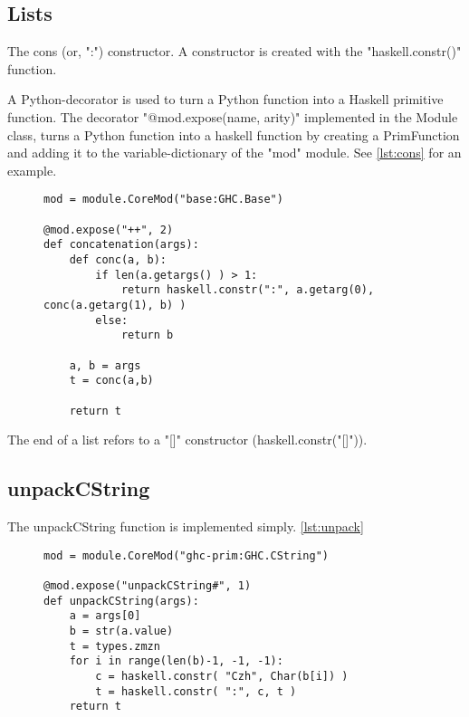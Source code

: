 \subsection{Lists}

The cons (or, ":") constructor. A constructor is created with the "haskell.constr()"
function.

A Python-decorator is used to turn a Python function into a Haskell primitive function.
The decorator "@mod.expose(name, arity)" implemented in the Module class, turns a Python 
function into a haskell function by creating a PrimFunction and adding it to the 
variable-dictionary of the "mod" module. See \ref{lst:cons} for an example.

\begin{figure}[H]
\lstset{ %
language=Python,
caption=Implementation of the Haskell ++ (concatenation) operator.,
label=lst:cons
}

\begin{lstlisting}
mod = module.CoreMod("base:GHC.Base")

@mod.expose("++", 2)
def concatenation(args):
    def conc(a, b):
        if len(a.getargs() ) > 1:
            return haskell.constr(":", a.getarg(0), conc(a.getarg(1), b) )
        else:
            return b

    a, b = args
    t = conc(a,b)

    return t 
\end{lstlisting}
\end{figure}


The end of a list refors to a "[]" constructor (haskell.constr("[]")).


\subsection{unpackCString}

The unpackCString function is implemented simply. \ref{lst:unpack}




\begin{figure}[H]
\lstset{ %
language=Python,
caption=Implementation of the unpackCString function.,
label=lst:unpack
}

\begin{lstlisting}
mod = module.CoreMod("ghc-prim:GHC.CString")

@mod.expose("unpackCString#", 1)
def unpackCString(args):
    a = args[0]
    b = str(a.value)
    t = types.zmzn 
    for i in range(len(b)-1, -1, -1):
        c = haskell.constr( "Czh", Char(b[i]) )
        t = haskell.constr( ":", c, t )
    return t 
\end{lstlisting}
\end{figure}




